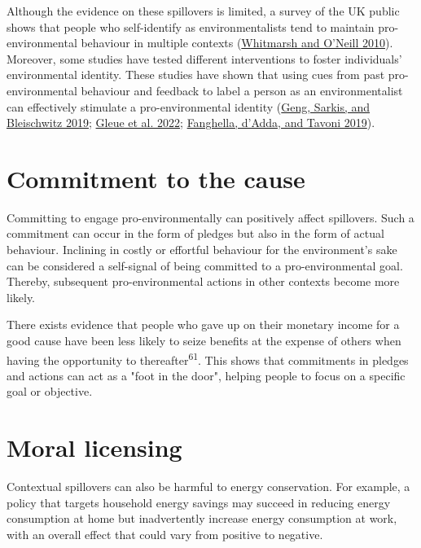 \documentclass[
  11pt,
  captions=heading]{scrreport}
\begin{document}
Although the evidence on these spillovers is limited, a survey of the UK
public shows that people who self-identify as environmentalists tend to
maintain pro-environmental behaviour in multiple contexts
(\protect\hyperlink{ref-whitmarsh2010green}{Whitmarsh and O'Neill
2010}). Moreover, some studies have tested different interventions to
foster individuals' environmental identity. These studies have shown
that using cues from past pro-environmental behaviour and feedback to
label a person as an environmentalist can effectively stimulate a
pro-environmental identity
(\protect\hyperlink{ref-geng2019globalize}{Geng, Sarkis, and Bleischwitz
2019}; \protect\hyperlink{ref-gleue2022identity}{Gleue et al. 2022};
\protect\hyperlink{ref-fanghella2019use}{Fanghella, d'Adda, and Tavoni
2019}).

\hypertarget{commitment-to-the-cause}{%
\section{Commitment to the cause}\label{commitment-to-the-cause}}

Committing to engage pro-environmentally can positively affect
spillovers. Such a commitment can occur in the form of pledges but also
in the form of actual behaviour. Inclining in costly or effortful
behaviour for the environment's sake can be considered a self-signal of
being committed to a pro-environmental goal. Thereby, subsequent
pro-environmental actions in other contexts become more likely.

There exists evidence that people who gave up on their monetary income
for a good cause have been less likely to seize benefits at the expense
of others when having the opportunity to thereafter\textsuperscript{61}.
This shows that commitments in pledges and actions can act as a "foot in
the door", helping people to focus on a specific goal or objective.

\hypertarget{moral-licensing}{%
\section{Moral licensing}\label{moral-licensing}}

Contextual spillovers can also be harmful to energy conservation. For
example, a policy that targets household energy savings may succeed in
reducing energy consumption at home but inadvertently increase energy
consumption at work, with an overall effect that could vary from
positive to negative.
\end{document}
